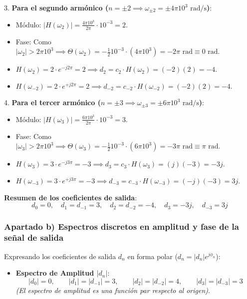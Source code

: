 \begin{resolucion}
3. \textbf{Para el segundo armónico ($n = \pm 2 \implies \omega_{\pm 2} = \pm 4\pi 10^3\text{ rad/s}$)}:
   \begin{itemize}
       \item Módulo: $\vert{}H(\omega_2)\vert{} = \frac{4\pi 10^3}{2\pi} \cdot 10^{-3} = 2$.
       \item Fase: Como $\vert{}\omega_2\vert{} > 2\pi 10^3 \implies \Theta(\omega_2) = -\frac{1}{2} 10^{-3} \cdot (4\pi 10^3) = -2\pi\text{ rad} \equiv 0\text{ rad}$.
       \item $H(\omega_2) = 2 \cdot e^{-j 2\pi} = 2 \implies d_2 = c_2 \cdot H(\omega_2) = (-2)(2) = -4$.
       \item $H(\omega_{-2}) = 2 \cdot e^{+j 2\pi} = 2 \implies d_{-2} = c_{-2} \cdot H(\omega_{-2}) = (-2)(2) = -4$.
   \end{itemize}

4. \textbf{Para el tercer armónico ($n = \pm 3 \implies \omega_{\pm 3} = \pm 6\pi 10^3\text{ rad/s}$)}:
   \begin{itemize}
       \item Módulo: $\vert{}H(\omega_3)\vert{} = \frac{6\pi 10^3}{2\pi} \cdot 10^{-3} = 3$.
       \item Fase: Como $\vert{}\omega_3\vert{} > 2\pi 10^3 \implies \Theta(\omega_3) = -\frac{1}{2} 10^{-3} \cdot (6\pi 10^3) = -3\pi\text{ rad} \equiv \pi\text{ rad}$.
       \item $H(\omega_3) = 3 \cdot e^{-j 3\pi} = -3 \implies d_3 = c_3 \cdot H(\omega_3) = (j)(-3) = -3j$.
       \item $H(\omega_{-3}) = 3 \cdot e^{+j 3\pi} = -3 \implies d_{-3} = c_{-3} \cdot H(\omega_{-3}) = (-j)(-3) = 3j$.
   \end{itemize}

\textbf{Resumen de los coeficientes de salida}:
\[d_0 = 0, \quad d_1 = d_{-1} = 3, \quad d_2 = d_{-2} = -4, \quad d_3 = -3j, \quad d_{-3} = 3j\]

\subsubsection*{Apartado b) Espectros discretos en amplitud y fase de la señal de salida}

Expresando los coeficientes de salida $d_n$ en forma polar ($d_n = \vert{}d_n\vert{} e^{j \phi_n}$):
\begin{itemize}
    \item \textbf{Espectro de Amplitud $\vert{}d_n\vert{}$}:
      \[\vert{}d_0\vert{} = 0, \qquad \vert{}d_1\vert{} = \vert{}d_{-1}\vert{} = 3, \qquad \vert{}d_2\vert{} = \vert{}d_{-2}\vert{} = 4, \qquad \vert{}d_3\vert{} = \vert{}d_{-3}\vert{} = 3\]
      \textit{(El espectro de amplitud es una función par respecto al origen)}.


\end{itemize}
\end{resolucion}
